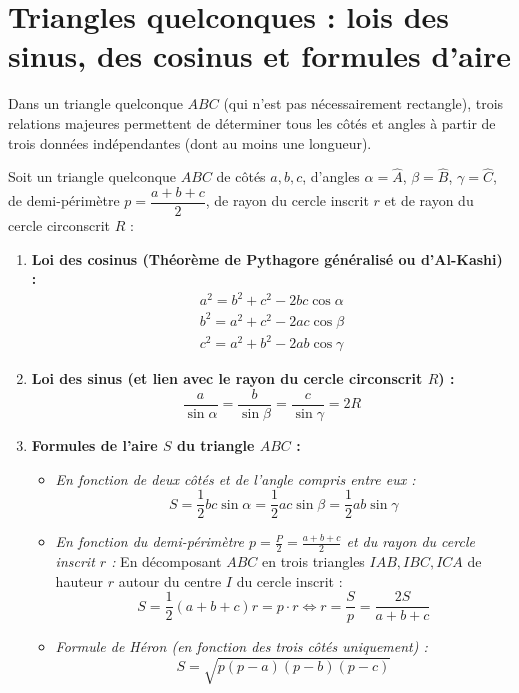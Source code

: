 \section{Triangles quelconques : lois des sinus, des cosinus et formules d'aire}

Dans un triangle quelconque $ABC$ (qui n'est pas nécessairement rectangle), trois relations majeures permettent de déterminer tous les côtés et angles à partir de trois données indépendantes (dont au moins une longueur).

\begin{theoreme}
Soit un triangle quelconque $ABC$ de côtés $a, b, c$, d'angles $\alpha = \widehat{A}$, $\beta = \widehat{B}$, $\gamma = \widehat{C}$, de demi-périmètre $p = \dfrac{a+b+c}{2}$, de rayon du cercle inscrit $r$ et de rayon du cercle circonscrit $R$ :
\begin{enumerate}
    \item \textbf{Loi des cosinus (Théorème de Pythagore généralisé ou d'Al-Kashi) :}
    \begin{align}
        \boxed{a^2 = b^2 + c^2 - 2bc\cos\alpha} \\
        b^2 = a^2 + c^2 - 2ac\cos\beta \\
        c^2 = a^2 + b^2 - 2ab\cos\gamma
    \end{align}
    \item \textbf{Loi des sinus (et lien avec le rayon du cercle circonscrit $R$) :}
    \begin{equation}
        \boxed{\frac{a}{\sin\alpha} = \frac{b}{\sin\beta} = \frac{c}{\sin\gamma} = 2R}
    \end{equation}
    \item \textbf{Formules de l'aire $S$ du triangle $ABC$ :}
    \begin{itemize}
        \item \emph{En fonction de deux côtés et de l'angle compris entre eux :}
        \[
            \boxed{S = \frac{1}{2}bc\sin\alpha = \frac{1}{2}ac\sin\beta = \frac{1}{2}ab\sin\gamma}
        \]
        \item \emph{En fonction du demi-périmètre $p = \frac{P}{2} = \frac{a+b+c}{2}$ et du rayon du cercle inscrit $r$ :} En décomposant $ABC$ en trois triangles $IAB, IBC, ICA$ de hauteur $r$ autour du centre $I$ du cercle inscrit :
        \[
            \boxed{S = \frac{1}{2}(a+b+c)r = p \cdot r \iff r = \frac{S}{p} = \frac{2S}{a+b+c}}
        \]
        \item \emph{Formule de Héron (en fonction des trois côtés uniquement) :}
        \[
            \boxed{S = \sqrt{p(p-a)(p-b)(p-c)}}
        \]
    \end{itemize}
\end{enumerate}
\end{theoreme}

